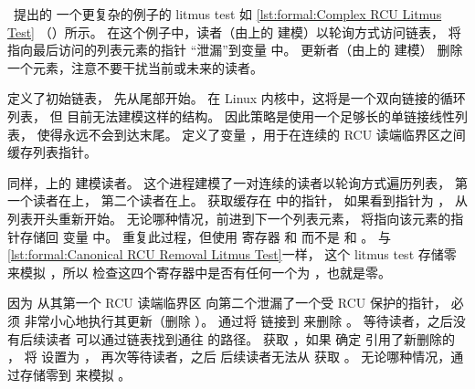 \begin{fcvref}
~\cite{RomanPenyaev2018rrRCU}提出的
一个更复杂的例子的 litmus test 如
\cref{lst:formal:Complex RCU Litmus Test}
（）所示。
在这个例子中，读者（由上的
 建模）以轮询方式访问链表，
将指向最后访问的列表元素的指针
``泄漏''到变量  中。
更新者（由上的  建模）
删除一个元素，注意不要干扰当前或未来的读者。

\QuickQuizEnd

定义了初始链表，
先从尾部开始。
在 Linux 内核中，这将是一个双向链接的循环列表，
但  目前无法建模这样的结构。
因此策略是使用一个足够长的单链接线性列表，
使得永远不会到达末尾。
定义了变量 ，用于在连续的
RCU 读端临界区之间缓存列表指针。

同样，上的  建模读者。
这个进程建模了一对连续的读者以轮询方式遍历列表，
第一个读者在上，
第二个读者在上。
获取缓存在  中的指针，
如果看到指针为 ，
从列表开头重新开始。
无论哪种情况，前进到下一个列表元素，
将指向该元素的指针存储回
变量  中。
重复此过程，但使用
寄存器  和  而不是  和 。
与\cref{lst:formal:Canonical RCU Removal Litmus Test}一样，
这个 litmus test 存储零来模拟 ，所以
检查这四个寄存器中是否有任何一个为
，也就是零。

因为  从其第一个 RCU 读端临界区
向第二个泄漏了一个受 RCU 保护的指针， 必须
非常小心地执行其更新（删除 ）。
通过将  链接到  来删除 。
等待读者，之后没有后续读者
可以通过链表找到通往  的路径。
获取 ，如果
确定  引用了新删除的 ，
将  设置为 ，
再次等待读者，之后
后续读者无法从  获取 。
无论哪种情况，通过存储零到 
来模拟 。


\end{fcvref}

